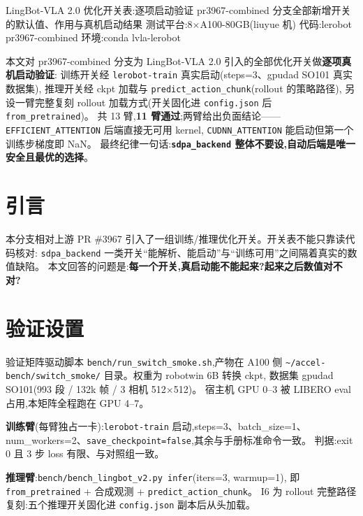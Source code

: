 \documentclass[11pt]{ctexart}
\begin{document}
{LingBot-VLA 2.0 优化开关表:逐项启动验证}
{pr3967-combined 分支全部新增开关的默认值、作用与真机启动结果}
{测试平台:8$\times$A100-80GB(liuyue 机) \quad 代码:lerobot pr3967-combined \quad 环境:conda lvla-lerobot}

\begin{cnabstract}
本文对 pr3967-combined 分支为 LingBot-VLA 2.0 引入的全部优化开关做\textbf{逐项真机启动验证}:
训练开关经 \texttt{lerobot-train} 真实启动(steps=3、gpudad SO101 真实数据集),
推理开关经 ckpt 加载与 \texttt{predict\_action\_chunk}(rollout 的策略路径),
另设一臂完整复刻 rollout 加载方式(开关固化进 \texttt{config.json} 后 \texttt{from\_pretrained})。
共 13 臂,\textbf{11 臂通过};两臂给出负面结论——\texttt{EFFICIENT\_ATTENTION} 后端直接无可用 kernel,
\texttt{CUDNN\_ATTENTION} 能启动但第一个训练步梯度即 NaN。
最终纪律一句话:\textbf{\texttt{sdpa\_backend} 整体不要设,自动后端是唯一安全且最优的选择}。
\end{cnabstract}

\section{引言}
本分支相对上游 PR \#3967 引入了一组训练/推理优化开关。开关表不能只靠读代码核对:
\texttt{sdpa\_backend} 一类开关``能解析、能启动''与``训练可用''之间隔着真实的数值缺陷。
本文回答的问题是:\textbf{每一个开关,真启动能不能起来?起来之后数值对不对?}

\section{验证设置}
验证矩阵驱动脚本 \texttt{bench/run\_switch\_smoke.sh},产物在 A100 侧
\texttt{\textasciitilde/accel-bench/}\allowbreak\texttt{switch\_smoke/} 目录。权重为 robotwin 6B 转换 ckpt,
数据集 gpudad SO101(993 段 / 132k 帧 / 3 相机 512$\times$512)。
宿主机 GPU 0--3 被 LIBERO eval 占用,本矩阵全程跑在 GPU 4--7。

\textbf{训练臂}(每臂独占一卡):\texttt{lerobot-train} 启动,steps=3、batch\_size=1、
num\_workers=2、\texttt{save\_checkpoint=}\allowbreak\texttt{false},其余与手册标准命令一致。
判据:exit 0 且 3 步 loss 有限、与对照组一致。

\textbf{推理臂}:\texttt{bench/bench\_lingbot\_v2.py infer}(iters=3, warmup=1),
即 \texttt{from\_pretrained} + 合成观测 + \texttt{predict\_action\_chunk}。
I6 为 rollout 完整路径复刻:五个推理开关固化进 \texttt{config.json} 副本后从头加载。
\end{document}
